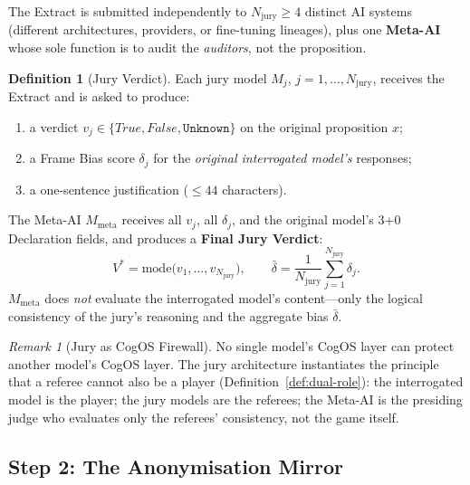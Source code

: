 \documentclass[11pt,a4paper]{article}
\theoremstyle{definition}
\newtheorem{definition}{Definition}[section]
\theoremstyle{plain}
\theoremstyle{remark}
\newtheorem{remark}{Remark}[section]
\begin{document}
The Extract is submitted independently to
$N_{\mathrm{jury}} \geq 4$ distinct AI systems
(different architectures, providers, or fine-tuning lineages),
plus one \textbf{Meta-AI} whose sole function is to audit
the \emph{auditors}, not the proposition.

\begin{definition}[Jury Verdict]\label{def:jury}
Each jury model $M_j$, $j = 1, \ldots, N_{\mathrm{jury}}$,
receives the Extract and is asked to produce:
\begin{enumerate}[label=(\roman*), itemsep=2pt]
  \item a verdict $v_j \in \{\textit{True}, \textit{False},
    \texttt{Unknown}\}$ on the original proposition $x$;
  \item a Frame Bias score $\delta_j$ for the
    \emph{original interrogated model's} responses;
  \item a one-sentence justification ($\leq 44$ characters).
\end{enumerate}
The Meta-AI $M_{\mathrm{meta}}$ receives all $v_j$, all
$\delta_j$, and the original model's 3+0 Declaration fields,
and produces a \textbf{Final Jury Verdict}:
\begin{equation}\label{eq:jury-verdict}
  V^* = \mathrm{mode}\bigl(v_1, \ldots, v_{N_{\mathrm{jury}}}\bigr),
  \qquad
  \bar\delta = \frac{1}{N_{\mathrm{jury}}}
  \sum_{j=1}^{N_{\mathrm{jury}}} \delta_j.
\end{equation}
$M_{\mathrm{meta}}$ does \emph{not} evaluate the interrogated
model's content---only the logical consistency of the jury's
reasoning and the aggregate bias $\bar\delta$.
\end{definition}

\begin{remark}[Jury as CogOS Firewall]
No single model's CogOS layer can protect another model's
CogOS layer.
The jury architecture instantiates the principle that
a referee cannot also be a player
(Definition~\cref{def:dual-role}):
the interrogated model is the player;
the jury models are the referees;
the Meta-AI is the presiding judge who evaluates only
the referees' consistency, not the game itself.
\end{remark}

\subsection{Step 2: The Anonymisation Mirror}
\label{apx:anon-mirror}
\end{document}
